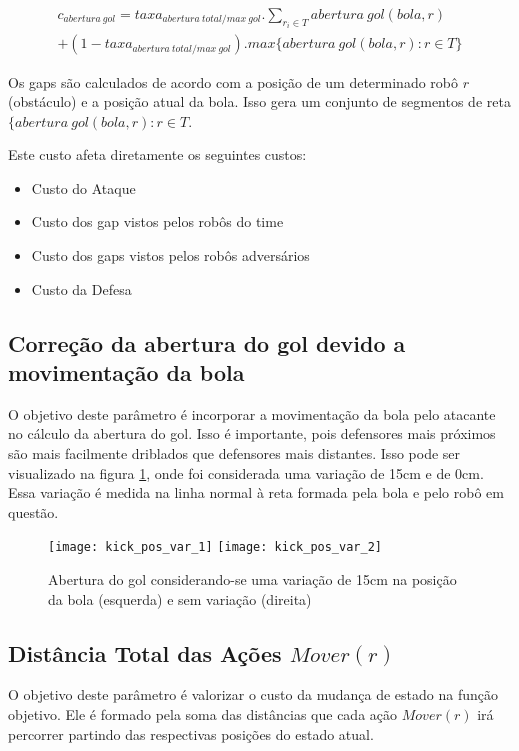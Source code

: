 \begin{multline} 
 c_{abertura{\ }gol} = taxa_{abertura{\ }total/max{\ }gol} .
   \sum_{r_i \in T} abertura{\ }gol(bola, r)\\
   + (1 - taxa_{abertura{\ }total/max{\ }gol}) .
   max \lbrace abertura{\ }gol(bola, r): r \in T \rbrace 
\end{multline}

Os gaps são calculados de acordo com a posição de um determinado robô $r$ (obstáculo)
e a posição atual da bola. Isso gera um conjunto de segmentos de reta
$\lbrace abertura{\ }gol(bola, r): r \in T $.

Este custo afeta diretamente os seguintes custos:
\begin{itemize}
  \item Custo do Ataque
  \item Custo dos gap vistos pelos robôs do time
  \item Custo dos gaps vistos pelos robôs adversários
  \item Custo da Defesa
\end{itemize}

\subsection{Correção da abertura do gol devido a movimentação da bola} 
O objetivo deste parâmetro é incorporar a movimentação
da bola pelo atacante no cálculo da abertura do gol. Isso é importante,
pois defensores mais
próximos são mais facilmente driblados que defensores mais distantes. Isso
pode ser visualizado na figura \ref{fig:kick_pos}, onde foi considerada
uma variação de 15cm e de 0cm. Essa variação é medida na linha normal
à reta formada pela bola e pelo robô em questão.


\begin{figure}[H]
  \centering
  \texttt{[image: kick\_pos\_var\_1]}
  \texttt{[image: kick\_pos\_var\_2]}
  \caption{Abertura do gol considerando-se uma variação de 15cm na 
           posição da bola (esquerda) e sem variação (direita)}\label{fig:kick_pos}
\end{figure}


\subsection{Distância Total das Ações $Mover(r)$} 
O objetivo deste parâmetro é valorizar o custo da
mudança de estado na função objetivo. Ele é formado pela soma das
distâncias que cada ação $Mover(r)$ irá percorrer partindo das
respectivas posições do estado atual.

